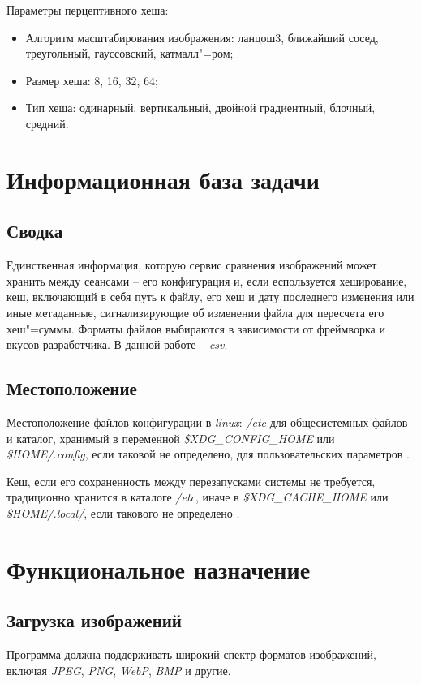 \documentclass[variant=courcework]{bsuir}
\begin{document}
Параметры перцептивного хеша:

\begin{itemize}
    \item Алгоритм масштабирования изображения: ланцош3, ближайший сосед,
          треугольный, гауссовский, катмалл"=ром;
    \item Размер хеша: 8, 16, 32, 64;
    \item Тип хеша: одинарный, вертикальный, двойной градиентный, блочный,
          средний.
\end{itemize}


\section{Информационная база задачи}

\subsection{Сводка}
Единственная информация, которую сервис сравнения изображений может хранить
между сеансами -- его конфигурация и, если еспользуется хеширование, кеш,
включающий в себя путь к файлу, его хеш и дату последнего изменения или иные
метаданные, сигнализирующие об изменении файла для пересчета его хеш"=суммы.
Форматы файлов выбираются в зависимости от фреймворка и вкусов разработчика. В
данной работе -- \textit{csv}.

\subsection{Местоположение}
Местоположение файлов конфигурации в \textit{linux}: \textit{/etc} для
общесистемных файлов и каталог, хранимый в переменной
\textit{\$XDG\_CONFIG\_HOME} или \textit{\$HOME/.config}, если таковой не
определено, для пользовательских параметров \cite{xdg_base_directory_spec}.

Кеш, если его сохраненность между перезапусками системы не требуется,
традиционно хранится в каталоге \textit{/etc}, иначе в
\textit{\$XDG\_CACHE\_HOME} или \textit{\$HOME/.local/}, если такового не
определено \cite{xdg_base_directory_spec}.

\section{Функциональное назначение}

\subsection{Загрузка изображений}
Программа должна поддерживать широкий спектр форматов изображений, включая
\textit{JPEG}, \textit{PNG}, \textit{WebP}, \textit{BMP} и другие.
\end{document}
